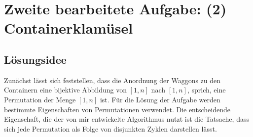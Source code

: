 \lstset{language=Scala}
\chapter{Zweite bearbeitete Aufgabe: (2) Containerklamüsel}
\minitoc
\clearpage
\section{Lösungsidee}
Zunächst lässt sich feststellen,
dass die Anordnung der Waggons zu den Containern eine bijektive Abbildung von $[1,n]$ nach $[1,n]$, sprich, eine Permutation der Menge $[1,n]$ ist.
Für die Lösung der Aufgabe werden bestimmte Eigenschaften von Permutationen verwendet. 
Die entscheidende Eigenschaft, die der von mir entwickelte Algorithmus nutzt ist die Tatsache,
dass sich jede Permutation als Folge von disjunkten Zyklen darstellen lässt.


